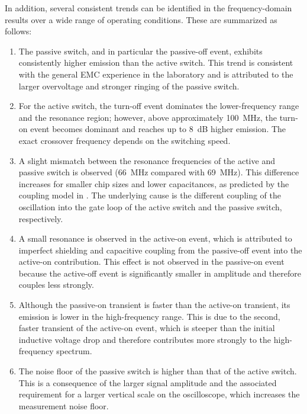 In addition, several consistent trends can be identified in the frequency-domain results over a wide range of operating conditions. These are summarized as follows:
\begin{enumerate}
	\item The passive switch, and in particular the passive-off event, exhibits consistently higher emission than the active switch. This trend is consistent with the general EMC experience in the laboratory and is attributed to the larger overvoltage and stronger ringing of the passive switch.
	\item For the active switch, the turn-off event dominates the lower-frequency range and the resonance region; however, above approximately \SI{100}{MHz}, the turn-on event becomes dominant and reaches up to \SI{8}{dB} higher emission. The exact crossover frequency depends on the switching speed.
	\item A slight mismatch between the resonance frequencies of the active and passive switch is observed (\SI{66}{MHz} compared with \SI{69}{MHz}). 
	This difference increases for smaller chip sizes and lower capacitances, as predicted by the coupling model in \cite{liu_modeling_2016}. 
	The underlying cause is the different coupling of the oscillation into the gate loop of the active switch and the passive switch, respectively.
	\item A small resonance is observed in the active-on event, which is attributed to imperfect shielding and capacitive coupling from the passive-off event into the active-on contribution. 
	This effect is not observed in the passive-on event because the active-off event is significantly smaller in amplitude and therefore couples less strongly.
	\item Although the passive-on transient is faster than the active-on transient, its emission is lower in the high-frequency range. 
	This is due to the second, faster transient of the active-on event, which is steeper than the initial inductive voltage drop and therefore contributes more strongly to the high-frequency spectrum.
	\item The noise floor of the passive switch is higher than that of the active switch. 
	This is a consequence of the larger signal amplitude and the associated requirement for a larger vertical scale on the oscilloscope, which increases the measurement noise floor.
\end{enumerate}

